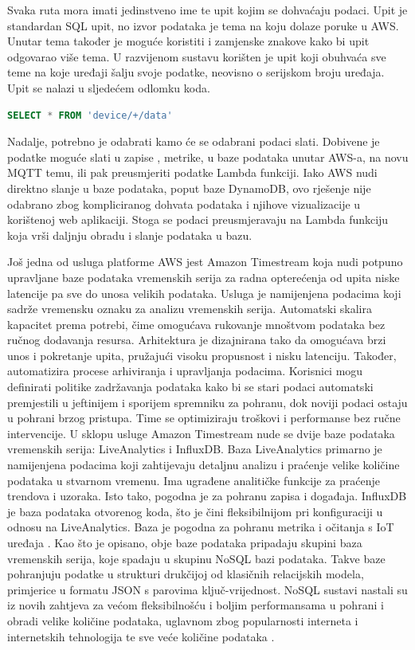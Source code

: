 Svaka ruta mora imati jedinstveno ime te upit kojim se dohvaćaju podaci. Upit je standardan SQL upit, no izvor podataka je tema na koju dolaze poruke u AWS. Unutar tema također je moguće koristiti i zamjenske znakove  kako bi upit odgovarao više tema. U razvijenom sustavu korišten je upit koji obuhvaća sve teme na koje uređaji šalju svoje podatke, neovisno o serijskom broju uređaja. Upit se nalazi u sljedećem odlomku koda. 

\begin{lstlisting}[caption={SQL upit rute za podatke s uređaja}, language=sql]
	SELECT * FROM 'device/+/data' 
\end{lstlisting}

Nadalje, potrebno je odabrati kamo će se odabrani podaci slati. Dobivene je podatke moguće slati u zapise , metrike, u baze podataka unutar AWS-a, na novu MQTT temu, ili pak preusmjeriti podatke Lambda funkciji. Iako AWS nudi direktno slanje u baze podataka, poput baze DynamoDB, ovo rješenje nije odabrano zbog kompliciranog dohvata podataka i njihove vizualizacije u korištenoj web aplikaciji. Stoga se podaci preusmjeravaju na Lambda funkciju koja vrši daljnju obradu i slanje podataka u bazu. 

Još jedna od usluga platforme AWS jest Amazon Timestream koja nudi potpuno upravljane baze podataka vremenskih serija za radna opterećenja od upita niske latencije pa sve do unosa velikih podataka. Usluga je namijenjena podacima koji sadrže vremensku oznaku za analizu vremenskih serija. Automatski skalira kapacitet prema potrebi, čime omogućava rukovanje mnoštvom podataka bez ručnog dodavanja resursa. Arhitektura je dizajnirana tako da omogućava brzi unos i pokretanje upita, pružajući visoku propusnost i nisku latenciju. Također, automatizira procese arhiviranja i upravljanja podacima. Korisnici mogu definirati politike zadržavanja podataka kako bi se stari podaci automatski premjestili u jeftinijem i sporijem spremniku za pohranu, dok noviji podaci ostaju u pohrani brzog pristupa. Time se optimiziraju troškovi i performanse bez ručne intervencije. U sklopu usluge Amazon Timestream nude se dvije baze podataka vremenskih serija: LiveAnalytics i InfluxDB. Baza LiveAnalytics primarno je namijenjena podacima koji zahtijevaju detaljnu analizu i praćenje velike količine podataka u stvarnom vremenu. Ima ugrađene analitičke funkcije za praćenje trendova i uzoraka. Isto tako, pogodna je za pohranu zapisa i događaja. InfluxDB je baza podataka otvorenog koda, što je čini fleksibilnijom pri konfiguraciji u odnosu na LiveAnalytics. Baza je pogodna za pohranu metrika i očitanja s IoT uređaja \cite{aws_docs}. Kao što je opisano, obje baze podataka pripadaju skupini baza vremenskih serija, koje spadaju u skupinu NoSQL bazi podataka. Takve baze pohranjuju podatke u strukturi drukčijoj od klasičnih relacijskih modela, primjerice u formatu JSON s parovima ključ-vrijednost. NoSQL sustavi nastali su iz novih zahtjeva za većom fleksibilnošću i boljim performansama u pohrani i obradi velike količine podataka, uglavnom zbog popularnosti interneta i internetskih tehnologija te sve veće količine podataka \cite{nosql}. 

